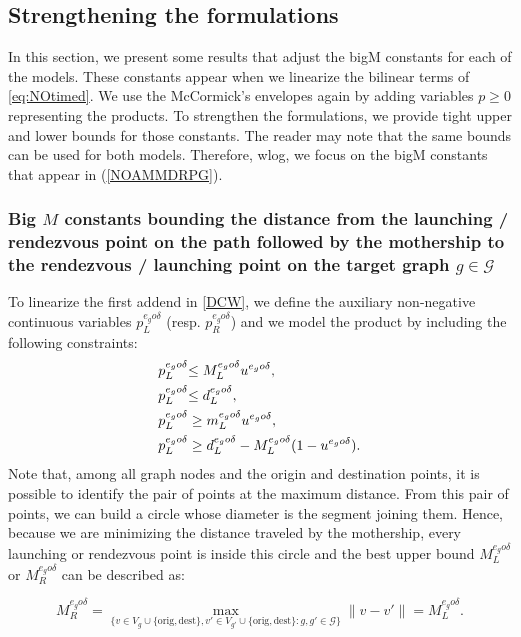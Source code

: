 \documentclass[10pt,a4paper]{elsarticle}
\newcommand{\CV}[1]{{\color{black}#1}}
\newcommand{\RE}[1]{{\color{black}#1}}
\newcommand{\EN}[1]{{\color{black}#1}}
\begin{document}
			\subsection*{Strengthening the formulations}
			\noindent
			In this section\RE{,} we present some results that adjust the bigM constants for each of the models. These constants appear when we linearize the bilinear terms of \eqref{eq:NOtimed}. We use the McCormick's envelopes \EN{again} by adding variables $p\geq 0$  representing the products. \CV{To} strengthen the formulations\RE{,} we provide tight upper and lower bounds for those constants. The reader may note that the same bounds can be used for both models. Therefore, wlog, we focus on the bigM constants that appear in (\ref{NOAMMDRPG}).
			
						
			
			
			\subsubsection*{Big $M$ constants bounding the distance from the launching / rendezvous point on the path followed by the mothership to the rendezvous / launching point on the target graph $g\in \mathcal{G}$}
			
			
				\noindent
				\RE{To linearize the first addend in \eqref{DCW}}, we define the auxiliar\CV{y} non-negative continuous variables $p_L^{e_go\delta}$ (resp. $p_R^{e_go\delta}$) and we model the product by including the following constraints:
				\begin{align*}
					\RE{p_L^{e_go\delta}} & \RE{\leq  M_L^{e_go\delta}u^{e_go\delta},}\\
					\RE{p_L^{e_go\delta}} & \RE{\leq d_L^{e_go\delta},} \\
					p_L^{e_go\delta} & \geq m_L^{e_go\delta} u^{e_go\delta}, \\
					p_L^{e_go\delta} & \geq d_L^{e_go\delta} - M_L^{e_go\delta}(1-u^{e_go\delta}).
				\end{align*}
				\RE{Note that, among all graph nodes and the origin and destination points, it is possible to identify the pair of points at the maximum distance. From this pair of points, we can build a circle whose diameter is the segment joining them. Hence, because we are minimizing the distance traveled by the mothership, every launching  or rendezvous point is inside this circle and the best upper bound $M_L^{e_go\delta}$ or $M_R^{e_go\delta}$ can be described as:}
				
				$$
				M_R^{e_go\delta} = \max_{\{v\in V_g\cup\{\text{orig}, \text{dest}\}, v'\in V_{g'}\cup\{\text{orig}, \text{dest}\} : g, g'\in\mathcal G\}} \|v - v'\| = M_L^{e_go\delta}.
				$$
				
\end{document}
